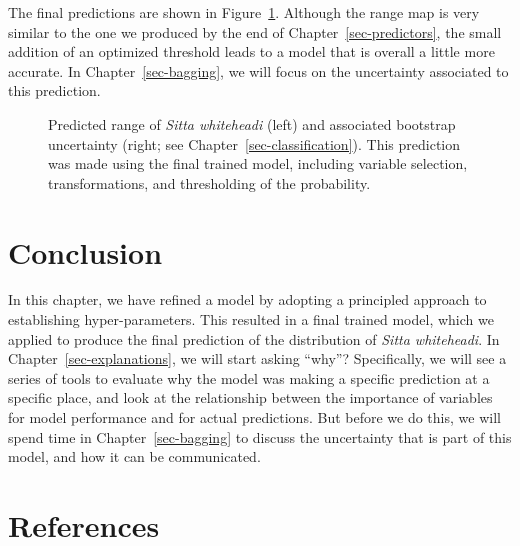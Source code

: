 \documentclass[
  letterpaper,
]{scrbook}
\begin{document}
The final predictions are shown in Figure~\ref{fig-tuning-map}. Although
the range map is very similar to the one we produced by the end of
Chapter~\ref{sec-predictors}, the small addition of an optimized
threshold leads to a model that is overall a little more accurate. In
Chapter~\ref{sec-bagging}, we will focus on the uncertainty associated
to this prediction.

\begin{figure}[pbt]


\caption{\label{fig-tuning-map}Predicted range of \emph{Sitta
whiteheadi} (left) and associated bootstrap uncertainty (right; see
Chapter~\ref{sec-classification}). This prediction was made using the
final trained model, including variable selection, transformations, and
thresholding of the probability.}

\end{figure}%

\section{Conclusion}\label{conclusion-5}

In this chapter, we have refined a model by adopting a principled
approach to establishing hyper-parameters. This resulted in a final
trained model, which we applied to produce the final prediction of the
distribution of \emph{Sitta whiteheadi}. In
Chapter~\ref{sec-explanations}, we will start asking ``why''?
Specifically, we will see a series of tools to evaluate why the model
was making a specific prediction at a specific place, and look at the
relationship between the importance of variables for model performance
and for actual predictions. But before we do this, we will spend time in
Chapter~\ref{sec-bagging} to discuss the uncertainty that is part of
this model, and how it can be communicated.

\section*{References}\label{bibliography-7}

\end{document}

